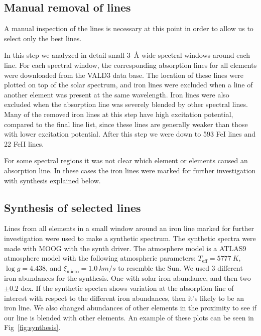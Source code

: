 \documentclass{aa}
\begin{document}
\subsection{Manual removal of lines}
\label{sub:manual_removal_of_lines}

A manual inspection of the lines is necessary at this
point in order to allow us to select only the best lines.

In this step we analyzed in detail small \SI{3}{\angstrom} wide spectral
windows around each line. For each spectral window, the corresponding
absorption lines for all elements were downloaded from the VALD3 data
base. The location of these lines were plotted on top of the solar
spectrum, and iron lines were excluded when a line of another element
was present at the same wavelength. Iron lines were also excluded when
the absorption line was severely blended by other spectral lines. Many
of the removed iron lines at this step have high excitation potential,
compared to the final line list, since these lines are generally weaker
than those with lower excitation potential. After this step
we were down to 593 FeI lines and 22 FeII lines.

For some spectral regions it was not clear which element or elements
caused an absorption line. In these cases the iron lines were marked for
further investigation with synthesis explained below.


\subsection{Synthesis of selected lines}
\label{sub:synthesis_of_selected_lines}

Lines from all elements in a small window around an iron line marked
for further investigation were used to make a synthetic spectrum.
The synthetic spectra were made with MOOG with the synth driver. The
atmosphere model is a ATLAS9 atmosphere model \citep{Kurucz1993} with
the following atmospheric parameters: $T_\mathrm{eff}=\SI{5777}{K}$,
$\log g = 4.438$, and $\xi_\mathrm{micro} = \SI{1.0}{km/s}$ to resemble
the Sun. We used 3 different iron abundances for the synthesis. One
with solar iron abundance, and then two $\pm0.2$ dex. If the synthetic
spectra shows variation at the absorption line of interest with respect
to the different iron abundances, then it's likely to be an iron line.
We also changed abundances of other elements in the proximity to see if
our line is blended with other elements. An example of these plots can
be seen in Fig~\ref{fig:synthesis}.
\end{document}
